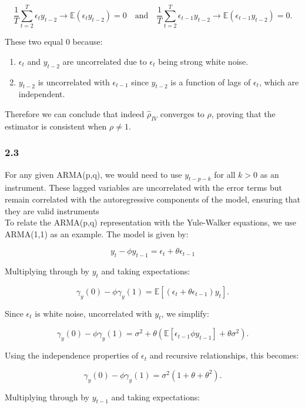 \documentclass{article}
\begin{document}
\[
\frac{1}{T}\sum_{t=2}^{T} \epsilon_{t}y_{t-2} \to \mathbb{E}(\epsilon_{t}y_{t-2}) = 0 \quad \text{and} \quad \frac{1}{T}\sum_{t=2}^{T} \epsilon_{t-1}y_{t-2} \to \mathbb{E}(\epsilon_{t-1}y_{t-2}) = 0.
\]

These two equal 0 because: \begin{enumerate}
  \item $\epsilon_{t}$ and $y_{t-2}$ are uncorrelated due to $\epsilon_{t}$ being strong white noise.
  \item $y_{t-2}$ is uncorrelated with $\epsilon_{t-1}$ since $y_{t-2}$ is a function of lags of $\epsilon_{t}$, which are independent. \\
\end{enumerate}


Therefore we can conclude that indeed $\hat{\rho}_{IV}$ converges to $\rho$, proving that the estimator is consistent when $\rho \neq 1$.

\subsubsection*{2.3}

For any given ARMA(p,q), we would need to use $y_{t-p-k}$ for all $k > 0$ as an instrument. These lagged variables are uncorrelated with the error terms but remain correlated with the autoregressive components of the model, ensuring that they are valid instruments \\

To relate the ARMA(p,q) representation with the Yule-Walker equations, we use ARMA(1,1) as an example. The model is given by:

\[
y_{t} - \phi y_{t-1} = \epsilon_{t} + \theta \epsilon_{t-1}
\]


Multiplying through by $y_t$ and taking expectations:

\[
\gamma_{y}(0) - \phi\gamma_{y}(1) = \mathbb{E}[(\epsilon_{t} + \theta \epsilon_{t-1}) y_{t}].
\]

Since $\epsilon_t$ is white noise, uncorrelated with $y_t$, we simplify:

\[
\gamma_{y}(0) - \phi\gamma_{y}(1) = \sigma^{2} + \theta (\mathbb{E}[\epsilon_{t-1} \phi y_{t-1}] + \theta \sigma^{2}).
\]

Using the independence properties of $\epsilon_t$ and recursive relationships, this becomes:

\[
\gamma_{y}(0) - \phi\gamma_{y}(1) = \sigma^{2} (1 + \theta + \theta^{2}).
\]


Multiplying through by $y_{t-1}$ and taking expectations:
\end{document}
